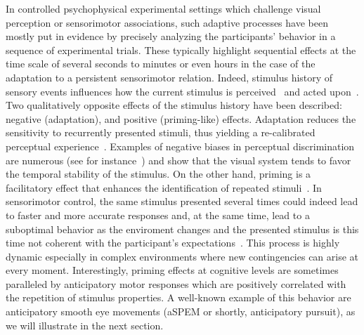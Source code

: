\documentclass[10pt,letterpaper]{article}
\newcommand{\citep}[1]{\cite{#1}}
\newcommand{\Rone}[1]{\textbf{\textcolor{magenta}{[rev 1: #1]}}}
\newcommand{\AM}[1]{\textbf{\textcolor{blue}{[AM: #1]}}}
\begin{document}
In controlled psychophysical experimental settings which challenge visual perception or sensorimotor associations,
such adaptive processes have been mostly put in evidence
by precisely analyzing the participants' behavior in a sequence of experimental trials.
These typically highlight sequential effects
at the time scale of several seconds to minutes
or even hours in the case of the adaptation to a persistent sensorimotor relation.
Indeed, stimulus history of sensory events influences
how the current stimulus is perceived~\citep{Sotiropoulos2011,Adams12,ChopinMamassian2012,FischerWhitney2014,Cicchini_PRSB_2018} and
acted upon~\citep{WallmanFuchs1998,Carpenter1995, Maus2015,Damasse18}.
Two qualitatively opposite effects of the stimulus history have been described:
negative (adaptation), and positive (priming-like) effects.
Adaptation reduces the sensitivity to recurrently presented stimuli,
thus yielding a re-calibrated perceptual experience~\citep{Clifford2007, Webster2011, Kohn2007}.
Examples of negative biases in perceptual discrimination are numerous
(see for instance~\citep{KanaiVerstraten2005,ChopinMamassian2012}) and
show that the visual system tends
to favor the temporal stability of the stimulus.
On the other hand, priming is a facilitatory effect that
enhances the identification of repeated stimuli~\citep{Verstraten1994, Tiest2009}.
In sensorimotor control,
the same stimulus presented several times could indeed
lead to faster and more accurate responses and,
at the same time, lead to a suboptimal behavior
as the enviroment changes and the presented stimulus is this time not coherent
with the participant's expectations~\citep{Hyman1953, Yu2009}.
This process is highly dynamic especially in complex environments
where new contingencies can arise at every moment.
Interestingly, priming effects at cognitive levels
are sometimes paralleled by anticipatory motor responses
which are positively correlated with the repetition of stimulus properties.
A well-known example of this behavior
are anticipatory smooth eye movements (aSPEM or shortly, anticipatory pursuit),
as we will illustrate in the next section.
\end{document}

